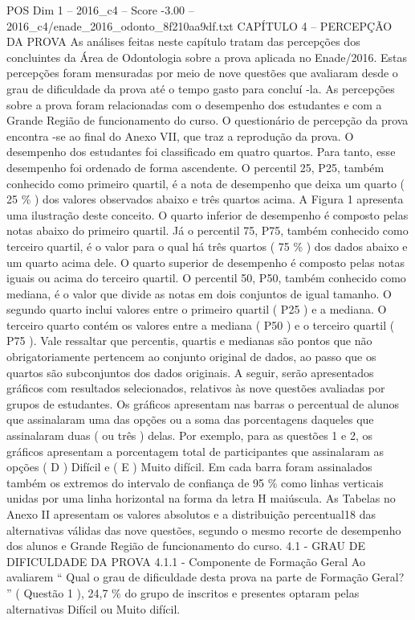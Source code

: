 \begin{textsample}{POS Dim 1 – 2016\_c4 – Score -3.00 – 2016\_c4/enade\_2016\_odonto\_8f210aa9df.txt}  \label{ex:f1_pos_285}
CAPÍTULO 4 – PERCEPÇÃO DA PROVA As análises feitas neste capítulo tratam das percepções dos concluintes da Área de Odontologia sobre a prova aplicada no Enade/2016.
Estas percepções foram mensuradas por meio de nove questões que avaliaram desde o grau de dificuldade da prova até o tempo gasto para concluí -la.
As percepções sobre a prova foram relacionadas com o desempenho dos estudantes e com a Grande Região de funcionamento do curso.
O questionário de percepção da prova encontra -se ao final do Anexo VII, que traz a reprodução da prova.
O desempenho dos estudantes foi classificado em quatro quartos.
Para tanto, esse desempenho foi ordenado de forma ascendente.
O percentil 25, P25, também conhecido como primeiro quartil, é a nota de desempenho que deixa um quarto ( 25 \% ) dos valores observados abaixo e três quartos acima.
A Figura 1 apresenta uma ilustração deste conceito.
O quarto inferior de desempenho é composto pelas notas abaixo do primeiro quartil.
Já o percentil 75, P75, também conhecido como terceiro quartil, é o valor para o qual há três quartos ( 75 \% ) dos dados abaixo e um quarto acima dele.
O quarto superior de desempenho é composto pelas notas iguais ou acima do terceiro quartil.
O percentil 50, P50, também conhecido como mediana, é o valor que divide as notas em dois conjuntos de igual tamanho.
O segundo quarto inclui valores entre o primeiro quartil ( P25 ) e a mediana.
O terceiro quarto contém os valores entre a mediana ( P50 ) e o terceiro quartil ( P75 ).
Vale ressaltar que percentis, quartis e medianas são pontos que não obrigatoriamente pertencem ao conjunto original de dados, ao passo que os quartos são subconjuntos dos dados originais.
A seguir, serão apresentados gráficos com resultados selecionados, relativos às nove questões avaliadas por grupos de estudantes.
Os gráficos apresentam nas barras o percentual de alunos que assinalaram uma das opções ou a soma das porcentagens daqueles que assinalaram duas ( ou três ) delas.
Por exemplo, para as questões 1 e 2, os gráficos apresentam a porcentagem total de participantes que assinalaram as opções ( D ) Difícil e ( E ) Muito difícil.
Em cada barra foram assinalados também os extremos do intervalo de confiança de 95 \% como linhas verticais unidas por uma linha horizontal na forma da letra H maiúscula.
As Tabelas no Anexo II apresentam os valores absolutos e a distribuição percentual18 das alternativas válidas das nove questões, segundo o mesmo recorte de desempenho dos alunos e Grande Região de funcionamento do curso. 4.1 - GRAU DE DIFICULDADE DA PROVA 4.1.1 - Componente de Formação Geral Ao avaliarem “ Qual o grau de dificuldade desta prova na parte de Formação Geral? ” ( Questão 1 ), 24,7 \% do grupo de inscritos e presentes optaram pelas alternativas Difícil ou Muito difícil.

\end{textsample}
